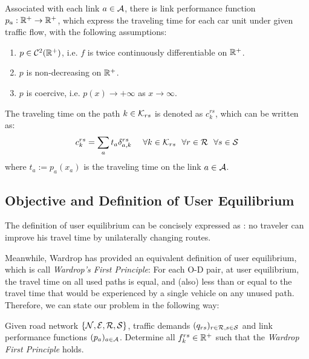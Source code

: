 \documentclass{article}
\begin{document}
Associated with each link $ a \in \mathcal{A} $, there is link performance function $ p_a : \mathbb{R}^+ \rightarrow \mathbb{R}^+ $, which express the traveling time for each car unit under given traffic flow, with the following assumptions:
\begin{enumerate}
    \item $ p \in \mathcal{C}^2 (\mathbb{R}^+) $, i.e. $ f $ is twice continuously differentiable on $ \mathbb{R}^+ $.
    \item $ p $ is non-decreasing on $ \mathbb{R}^+ $.
    \item $ p $ is coercive, i.e. $ p(x) \rightarrow + \infty $ as $ x \rightarrow \infty $.
\end{enumerate}
The traveling time on the path $ k \in \mathcal{K}_{rs} $ is denoted as $ c_k^{rs} $, which can be written as: 
\begin{equation} \label{eq-link-time-to-path-time}
    c_k^{rs} = \sum_a t_a \delta_{a, k}^{rs} ~~~~ \forall k \in \mathcal{K}_{rs} ~~ \forall r \in \mathcal{R} ~~ \forall s \in \mathcal{S}
\end{equation}
where $ t_a := p_a (x_a) $ is the traveling time on the link $ a \in \mathcal{A} $.

\subsection{Objective and Definition of User Equilibrium}

The definition of user equilibrium can be concisely expressed as \cite{Shef85}: no traveler can improve his travel time by unilaterally changing routes.

Meanwhile, Wardrop \cite{wardrop1952road} has provided an equivalent definition of user equilibrium, which is call \textit{Wardrop's First Principle}: For each O-D pair, at user equilibrium, the travel time on all used paths is equal, and (also) less than or equal to the travel time that would be experienced by a single vehicle on any unused path. Therefore, we can state our problem in the following way:

\begin{prob}
    Given road network $ \{ \mathcal{N}, \mathcal{E}, \mathcal{R}, \mathcal{S} \} $, traffic demands $ (q_{rs})_{r \in \mathcal{R}, s \in \mathcal{S}} $ and link performance functions $ (p_a)_{a \in \mathcal{A}} $. Determine all $ f_k^{rs} \in \mathbb{R}^+ $ such that the \textit{Wardrop First Principle} holds.
\end{prob}
\end{document}
